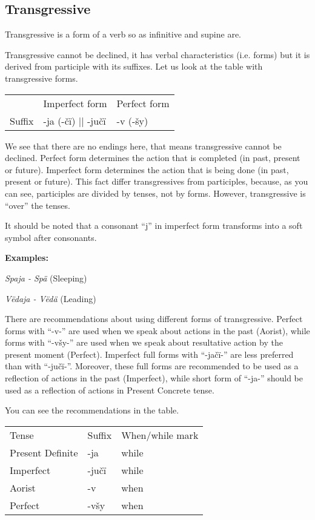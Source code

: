 \subsection{Transgressive}

Transgressive is a form of a verb so as infinitive and supine are.

Transgressive cannot be declined, it has verbal characteristics (i.e. forms) but it is derived from participle with its suffixes. Let us look at the table with transgressive forms.

\begin{table}
	\begin{tabular}{lll}
		& Imperfect form & Perfect form \\
		Suffix & -ja (-čï) || -jučï & -v (-šy)
	\end{tabular}
\end{table}

We see that there are no endings here, that means transgressive cannot be declined. Perfect form determines the action that is completed (in past, present or future). Imperfect form determines the action that is being done (in past, present or future). This fact differ transgressives from participles, because, as you can see, participles are divided by tenses, not by forms. However, transgressive is “over” the tenses. 

It should be noted that a consonant “j” in imperfect form transforms into a soft symbol after consonants. 

\textbf{Examples:}

\textit{Spaja - Spä} (Sleeping)

\textit{Vëdaja - Vëdä} (Leading)

There are recommendations about using different forms of transgressive. Perfect forms with “-v-” are used when we speak about actions in the past (Aorist), while forms with “-všy-” are used when we speak about resultative action by the present moment (Perfect). Imperfect full forms with “-jačï-” are less preferred than with “-jučï-”. Moreover, these full forms are recommended to be used as a reflection of actions in the past (Imperfect), while short form of “-ja-” should be used as a reflection of actions in Present Concrete tense.

You can see the recommendations in the table.

\begin{table}
	\begin{tabular}{lll}
		Tense & Suffix & When/while mark \\
		Present Definite & -ja & while \\
		Imperfect & -jučï & while \\
		Aorist & -v & when \\
		Perfect & -všy & when
	\end{tabular}
\end{table}

